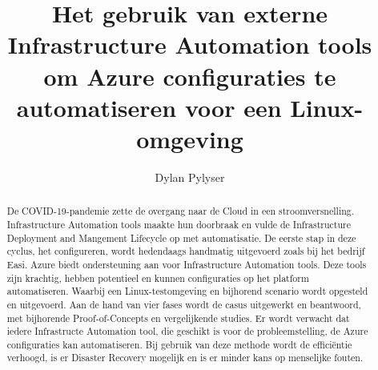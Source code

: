 \documentclass{hogent-article}
\title{Het gebruik van externe Infrastructure Automation tools om Azure configuraties te automatiseren voor een Linux-omgeving}
\author{Dylan Pylyser}
\begin{document}
\begin{abstract} %
De COVID-19-pandemie zette de overgang naar de Cloud in een stroomversnelling. Infrastructure Automation tools maakte hun doorbraak en vulde de Infrastructure Deployment and Mangement Lifecycle op met automatisatie. De eerste stap in deze cyclus, het configureren, wordt hedendaags handmatig uitgevoerd zoals bij het bedrijf Easi. Azure biedt ondersteuning aan voor Infrastructure Automation tools. Deze tools zijn krachtig, hebben potentieel en kunnen configuraties op het platform automatiseren. Waarbij een Linux-testomgeving en bijhorend scenario wordt opgesteld en uitgevoerd. Aan de hand van vier fases wordt de casus uitgewerkt en beantwoord, met bijhorende Proof-of-Concepts en vergelijkende studies. Er wordt verwacht dat iedere Infrastructe Automation tool, die geschikt is voor de probleemstelling, de Azure configuraties kan automatiseren. Bij gebruik van deze methode wordt de efficiëntie verhoogd, is er Disaster Recovery mogelijk en is er minder kans op menselijke fouten.
\end{abstract}

\tableofcontents



\printbibliography[heading=bibintoc]
\end{document}
